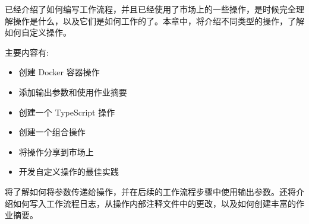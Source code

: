 已经介绍了如何编写工作流程，并且已经使用了市场上的一些操作，是时候完全理解操作是什么，以及它们是如何工作的了。本章中，将介绍不同类型的操作，了解如何自定义操作。

主要内容有:

\begin{itemize}
\item 
创建 Docker 容器操作

\item 
添加输出参数和使用作业摘要

\item 
创建一个 TypeScript 操作

\item 
创建一个组合操作

\item 
将操作分享到市场上

\item 
开发自定义操作的最佳实践
\end{itemize}

将了解如何将参数传递给操作，并在后续的工作流程步骤中使用输出参数。还将介绍如何写入工作流程日志，从操作内部注释文件中的更改，以及如何创建丰富的作业摘要。
